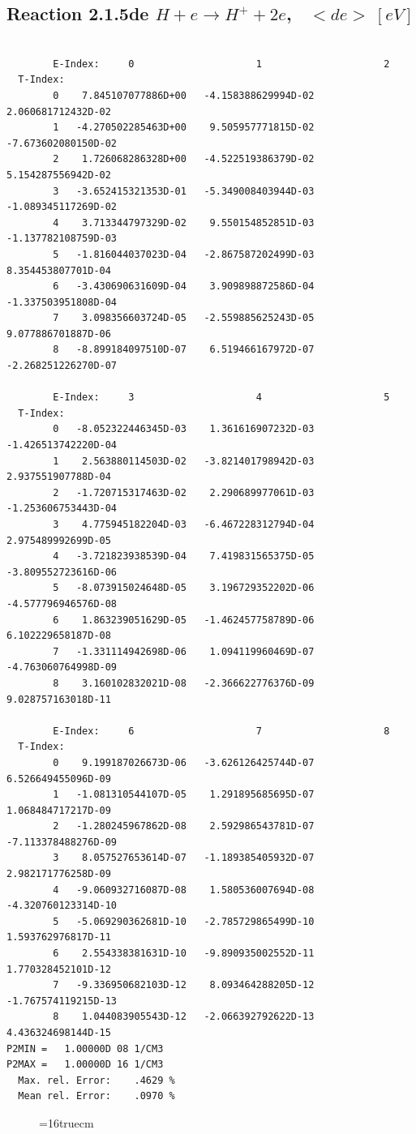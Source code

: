 \documentclass[12pt,dvipdfmx]{article}
\begin{document}
\newpage

\subsection{
Reaction 2.1.5de  $ H + e \rightarrow H^+ + 2e$, \   $<de> \ [eV]$}


\begin{small}\begin{verbatim}

        E-Index:     0                     1                     2
  T-Index:
        0    7.845107077886D+00   -4.158388629994D-02    2.060681712432D-02
        1   -4.270502285463D+00    9.505957771815D-02   -7.673602080150D-02
        2    1.726068286328D+00   -4.522519386379D-02    5.154287556942D-02
        3   -3.652415321353D-01   -5.349008403944D-03   -1.089345117269D-02
        4    3.713344797329D-02    9.550154852851D-03   -1.137782108759D-03
        5   -1.816044037023D-04   -2.867587202499D-03    8.354453807701D-04
        6   -3.430690631609D-04    3.909898872586D-04   -1.337503951808D-04
        7    3.098356603724D-05   -2.559885625243D-05    9.077886701887D-06
        8   -8.899184097510D-07    6.519466167972D-07   -2.268251226270D-07

        E-Index:     3                     4                     5
  T-Index:
        0   -8.052322446345D-03    1.361616907232D-03   -1.426513742220D-04
        1    2.563880114503D-02   -3.821401798942D-03    2.937551907788D-04
        2   -1.720715317463D-02    2.290689977061D-03   -1.253606753443D-04
        3    4.775945182204D-03   -6.467228312794D-04    2.975489992699D-05
        4   -3.721823938539D-04    7.419831565375D-05   -3.809552723616D-06
        5   -8.073915024648D-05    3.196729352202D-06   -4.577796946576D-08
        6    1.863239051629D-05   -1.462457758789D-06    6.102229658187D-08
        7   -1.331114942698D-06    1.094119960469D-07   -4.763060764998D-09
        8    3.160102832021D-08   -2.366622776376D-09    9.028757163018D-11

        E-Index:     6                     7                     8
  T-Index:
        0    9.199187026673D-06   -3.626126425744D-07    6.526649455096D-09
        1   -1.081310544107D-05    1.291895685695D-07    1.068484717217D-09
        2   -1.280245967862D-08    2.592986543781D-07   -7.113378488276D-09
        3    8.057527653614D-07   -1.189385405932D-07    2.982171776258D-09
        4   -9.060932716087D-08    1.580536007694D-08   -4.320760123314D-10
        5   -5.069290362681D-10   -2.785729865499D-10    1.593762976817D-11
        6    2.554338381631D-10   -9.890935002552D-11    1.770328452101D-12
        7   -9.336950682103D-12    8.093464288205D-12   -1.767574119215D-13
        8    1.044083905543D-12   -2.066392792622D-13    4.436324698144D-15
P2MIN =   1.00000D 08 1/CM3
P2MAX =   1.00000D 16 1/CM3
  Max. rel. Error:    .4629 %
  Mean rel. Error:    .0970 %

\end{verbatim}\end{small}
\begin{figure} \label{2.1.5li2}
\epsfxsize=16truecm
\end{figure}
\newpage
\end{document}
